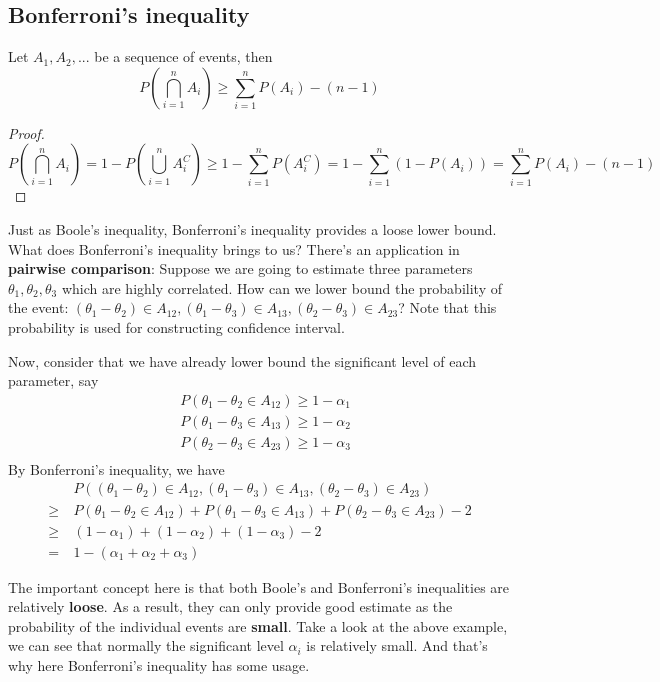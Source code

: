 \documentclass[11pt]{report}
\begin{document}
\subsection{Bonferroni's inequality}
\begin{theorem}
	\mbox{}
	
	Let $A_1,A_2,...$ be a sequence of events, then
	$$P(\bigcap_{i=1}^{n} A_i) \geq \sum_{i=1}^{n}P(A_i)-(n-1)$$
\end{theorem}
\begin{proof}
	$$P(\bigcap_{i=1}^{n} A_i) = 1-P(\bigcup_{i=1}^{n}A_i^C) \geq 1-\sum_{i=1}^{n}P(A_i^C) = 1-\sum_{i=1}^{n}(1-P(A_i)) = \sum_{i=1}^{n}P(A_i)-(n-1)$$
\end{proof}

Just as Boole's inequality, Bonferroni's inequality provides a loose lower bound. What does Bonferroni's inequality brings to us? There's an application in {\bf pairwise comparison}: Suppose we are going to estimate three parameters $\theta_1,\theta_2,\theta_3$ which are highly correlated. How can we lower bound the probability of the event: $(\theta_1-\theta_2)\in A_{12},(\theta_1-\theta_3)\in A_{13},(\theta_2-\theta_3)\in A_{23}$? Note that this probability is used for constructing confidence interval.

Now, consider that we have already lower bound the significant level of each parameter, say
\begin{align*}
&P(\theta_1-\theta_2\in A_{12})\geq 1-\alpha_1\\
&P(\theta_1-\theta_3\in A_{13})\geq 1-\alpha_2\\
&P(\theta_2-\theta_3\in A_{23})\geq 1-\alpha_3\\
\end{align*}
By Bonferroni's inequality, we have
\begin{align*}
&P((\theta_1-\theta_2)\in A_{12},(\theta_1-\theta_3)\in A_{13},(\theta_2-\theta_3)\in A_{23})\\
\geq\ &P(\theta_1-\theta_2\in A_{12}) + P(\theta_1-\theta_3\in A_{13}) + P(\theta_2-\theta_3\in A_{23}) - 2\\
\geq\ &(1-\alpha_1) + (1-\alpha_2) + (1-\alpha_3) - 2\\
=\ &1 - (\alpha_1+\alpha_2+\alpha_3)
\end{align*}

\begin{intuition}
	The important concept here is that both Boole's and Bonferroni's inequalities are relatively {\bf loose}. As a result, they can only provide good estimate as the probability of the individual events are {\bf small}. Take a look at the above example, we can see that normally the significant level $\alpha_i$ is relatively small. And that's why here Bonferroni's inequality has some usage.
\end{intuition}
\end{document}
